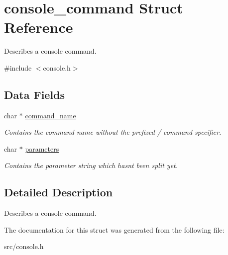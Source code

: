 \hypertarget{structconsole__command}{}\section{console\+\_\+command Struct Reference}
\label{structconsole__command}


Describes a console command.  




{\ttfamily \#include $<$console.\+h$>$}

\subsection*{Data Fields}
\begin{DoxyCompactItemize}
\item 
\hypertarget{structconsole__command_a2ebffff140caba31b51dbde12d078f20}{}char $\ast$ \hyperlink{structconsole__command_a2ebffff140caba31b51dbde12d078f20}{command\+\_\+name}\label{structconsole__command_a2ebffff140caba31b51dbde12d078f20}

\begin{DoxyCompactList}\small\item\em Contains the command name without the prefixed \textquotesingle{}/\textquotesingle{} command specifier. \end{DoxyCompactList}\item 
\hypertarget{structconsole__command_addb373441c0b9810dc7417b490ff39e8}{}char $\ast$ \hyperlink{structconsole__command_addb373441c0b9810dc7417b490ff39e8}{parameters}\label{structconsole__command_addb373441c0b9810dc7417b490ff39e8}

\begin{DoxyCompactList}\small\item\em Contains the parameter string which hasn\textquotesingle{}t been split yet. \end{DoxyCompactList}\end{DoxyCompactItemize}


\subsection{Detailed Description}
Describes a console command. 

The documentation for this struct was generated from the following file\+:\begin{DoxyCompactItemize}
\item 
src/console.\+h\end{DoxyCompactItemize}
